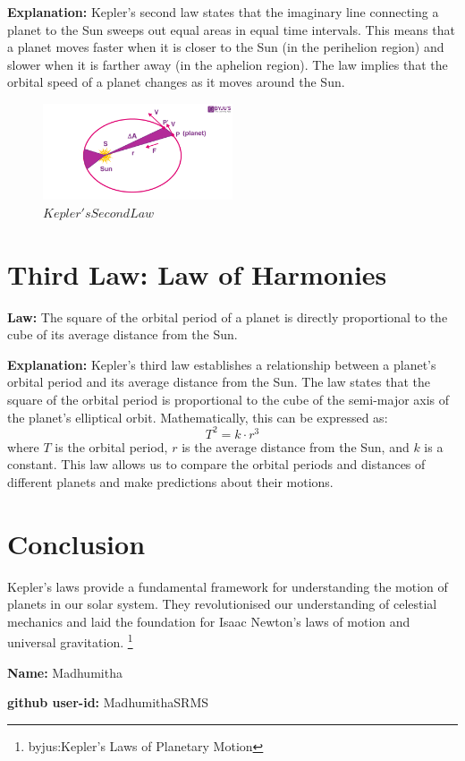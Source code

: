 \documentclass{article}
\begin{document}
\textbf{Explanation:} Kepler's second law states that the imaginary line connecting a planet to the Sun sweeps out equal areas in equal time intervals. This means that a planet moves faster when it is closer to the Sun (in the perihelion region) and slower when it is farther away (in the aphelion region). The law implies that the orbital speed of a planet changes as it moves around the Sun.

\begin{figure}[ht]
    \centering
    \includegraphics[width=0.5\textwidth]{imag2.jpg}
    \caption{$Kepler's Second Law$}
    \label{fig:example}
\end{figure}

\section{Third Law: Law of Harmonies}
\textbf{Law:} The square of the orbital period of a planet is directly proportional to the cube of its average distance from the Sun.

\textbf{Explanation:} Kepler's third law establishes a relationship between a planet's orbital period and its average distance from the Sun. The law states that the square of the orbital period is proportional to the cube of the semi-major axis of the planet's elliptical orbit. Mathematically, this can be expressed as:
\[
T^2 = k \cdot r^3
\]
where $T$ is the orbital period, $r$ is the average distance from the Sun, and $k$ is a constant. This law allows us to compare the orbital periods and distances of different planets and make predictions about their motions.

\section{Conclusion}

Kepler's laws provide a fundamental framework for understanding the motion of planets in our solar system. They revolutionised our understanding of celestial mechanics and laid the foundation for Isaac Newton's laws of motion and universal gravitation.
\footnote{byjus:Kepler's Laws of Planetary Motion}


\textbf{Name:} Madhumitha

\textbf{github user-id:} MadhumithaSRMS
\end{document}

